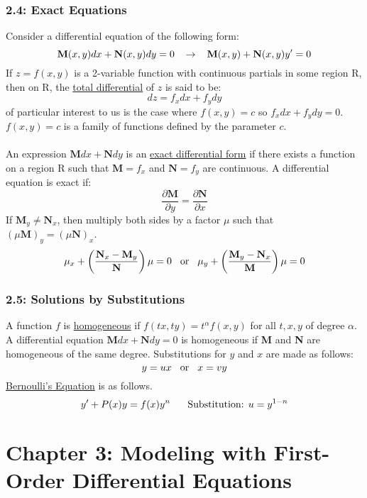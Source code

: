 \documentclass{article}
\begin{document}
\section*{2.4: Exact Equations}
Consider a differential equation of the following form:
\[\textbf{M}(x,y)dx+\textbf{N}(x,y)dy=0\hspace{3 mm}\rightarrow\hspace{3 mm}\textbf{M}(x,y)+\textbf{N}(x,y)y'=0\]
If \(z=f(x,y)\) is a 2-variable function with continuous partials in some region R, then on R, the \underline{total differential} of \(z\) is said to be:
\[dz=f_xdx+f_ydy\]
of particular interest to us is the case where \(f(x,y)=c\) so \(f_xdx+f_ydy=0\). \(f(x,y)=c\) is a family of functions defined by the parameter \(c\). \\\\
An expression \(\textbf{M}dx+\textbf{N}dy\) is an \underline{exact differential form} if there exists a function on a region R such that \(\textbf{M}=f_x\) and \(\textbf{N}=f_y\) are continuous. A differential equation is exact if:
\[\frac{\partial\textbf{M}}{\partial y}=\frac{\partial\textbf{N}}{\partial x}\]
If \(\textbf{M}_y\neq\textbf{N}_x\), then multiply both sides by a factor \(\mu\) such that \((\mu\textbf{M})_y=(\mu\textbf{N})_x\).
\[\mu_x+\left(\frac{\textbf{N}_x-\textbf{M}_y}{\textbf{N}}\right)\mu=0\hspace{3 mm}\textnormal{or}\hspace{3 mm}\mu_y+\left(\frac{\textbf{M}_y-\textbf{N}_x}{\textbf{M}}\right)\mu=0\]
\section*{2.5: Solutions by Substitutions}
A function \(f\) is \underline{homogeneous} if \(f(tx,ty)=t^\alpha f(x,y)\) for all \(t,x,y\) of degree \(\alpha\). A differential equation \(\textbf{M}dx+\textbf{N}dy=0\) is homogeneous if \textbf{M} and \textbf{N} are homogeneous of the same degree. Substitutions for \(y\) and \(x\) are made as follows:
\[y=ux\hspace{3 mm}\textnormal{or}\hspace{3 mm}x=vy\]
\underline{Bernoulli's Equation} is as follows.
\[y'+P(x)y=f(x)y^n\hspace{5 mm}\textnormal{ Substitution: }u=y^{1-n}\]
\part*{Chapter 3: Modeling with First-Order Differential Equations}
\end{document}
